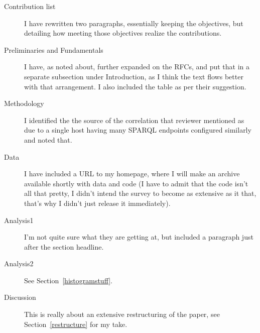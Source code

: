 \documentclass{article}
\begin{document}
\begin{description}
\item [Contribution list] I have rewritten two paragraphs, essentially
  keeping the objectives, but detailing how meeting those objectives
  realize the contributions.
\item [Preliminaries and Fundamentals] I have, as noted about, further
  expanded on the RFCs, and put that in a separate subsection under
  Introduction, as I think the text flows better with that
  arrangement. I also included the table as per their suggestion.
\item [Methodology] I identified the the source of the correlation
  that reviewer mentioned as due to a single host having many SPARQL
  endpoints configured similarly and noted that.
\item [Data] I have included a URL to my homepage, where I will make
  an archive available shortly with data and code (I have to admit
  that the code isn't all that pretty, I didn't intend the survey to
  become as extensive as it that, that's why I didn't just release it
  immediately).
\item [Analysis1] I'm not quite sure what they are getting at, but
  included a paragraph just after the section headline.
\item [Analysis2] See Section~\ref{histogramstuff}.
\item [Discussion] This is really about an extensive restructuring of
  the paper, see Section~\ref{restructure} for my take.
\end{description}





%

%
%

\end{document}
